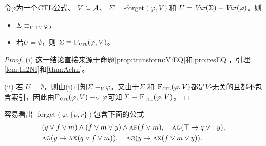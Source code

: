 \begin{theorem}\label{thm:soundness:forget:algorithm}
	令$\varphi$为一个$\textrm{CTL}$公式、 $V\subseteq\cal A$、 $\Sigma=$\CTL-forget$(\varphi,V)$和 $U=\textit{Var}(\Sigma)-\textit{Var}(\varphi)$。则
	\begin{itemize}
		\item[(i)] $\Sigma\equiv_{V\cup U}\varphi$，
		\item[(ii)] 若$U=\emptyset$，则 $\Sigma\equiv{\textsc{F}_{\textsc{ctl}}}(\varphi,V)$。
	\end{itemize}
\end{theorem}
\begin{proof}
	(i) 这一结论直接来源于命题\ref{prop:transform:V:EQ}和\ref{pro:resEQ}，引理\ref{lem:In2NI}和\ref{thm:Aclm}。
	
	(ii) 若 $U=\emptyset$，则由(i)可知$\Sigma\equiv_{V}\varphi$。又由于$\Sigma$ 和 ${\textsc{F}_{\textsc{ctl}}}(\varphi,V)$都是$V$-无关的且都不包含索引，因此由${\textsc{F}_{\textsc{ctl}}}(\varphi,V) \equiv_V \varphi$可知 $\Sigma\equiv{\textsc{F}_{\textsc{ctl}}}(\varphi,V)$。
\end{proof}


\begin{example}\label{examp:forget:algorithm}
	容易看出 \CTL-forget$(\varphi,\{p,r\})$包含下面的公式
	\begin{align*}%
		&  (q \vee f \vee m)\land (f \vee m \vee y)\land\ALL \FUTURE (f \vee m), \quad \ALL\GLOBAL ( \top \rto q\vee\neg y),  \\
		&  \ALL\GLOBAL(y \rto \ALL\NEXT(q \vee f\vee m)), \quad \ALL\GLOBAL( y \rto \ALL\NEXT(f\vee m\vee y)).
	\end{align*}
\end{example}


